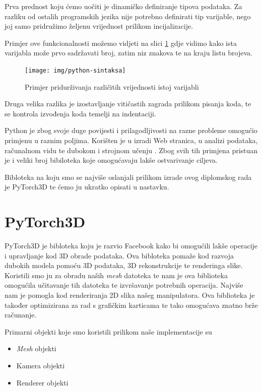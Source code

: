 \documentclass[times, utf8, diplomskirad]{fer}
\begin{document}
Prva prednost koju ćemo uočiti je dinamičko definiranje tipova podataka.
Za razliku od ostalih programskih jezika nije potrebno definirati tip varijable, nego joj samo pridružimo željenu vrijednost prilikom incijalizacije.

Primjer ove funkcionalnosti možemo vidjeti na slici \ref{fig:python-varijable} gdje vidimo kako ista varijabla može prvo sadržavati broj, zatim niz znakova te na kraju listu brojeva.

\begin{figure}[H]
    \centering
    \texttt{[image: img/python-sintaksa]}
    \caption{Primjer pridurživanja različitih vrijednosti istoj varijabli}
    \label{fig:python-varijable}
\end{figure}

Druga velika razlika je izostavljanje vitičastih zagrada prilikom pisanja koda, te se kontrola izvođenja koda temelji na indentaciji.

Python je zbog svoje duge povijesti i prilagodljivosti na razne probleme omogućio primjenu u raznim poljima.
Korišten je u izradi Web stranica, u analizi podataka, računalnom vidu te dubokom i strojnom učenju .
Zbog svih tih primjena pristuan je i veliki broj bibiloteka koje omogućavaju lakše ostvarivanje ciljeva.

Bibloteka na koju smo se najviše oslanjali prilikom izrade ovog diplomskog rada je PyTorch3D te ćemo ju ukratko opisati u nastavku.
\section{PyTorch3D}
PyTorch3D je bibloteka koju je razvio Facebook kako bi omogućili lakše operacije i upravljanje kod 3D obrade podataka.
Ova bibloteka pomaže kod razvoja dubokih modela pomoću 3D podataka, 3D rekonstrukcije te renderinga slike.
Koristili smo ju za obradu naših \textit{mesh} datoteka te nam je ova biblioteka omogućila učitavanje tih datoteka te izvršavanje potrebnih operacija.
Najviše nam je pomogla kod renderiranja 2D slika našeg manipulatora.
Ova biblioteka je također optimizirana za rad s grafičkim karticama te tako omogućava znatno brže računanje.
\newpage

Primarni objekti koje smo koristili prilikom naše implementacije su
\begin{itemize}
    \item \textit{Mesh} objekti
    \item Kamera objekti
    \item Renderer objekti
\end{itemize}
\end{document}
